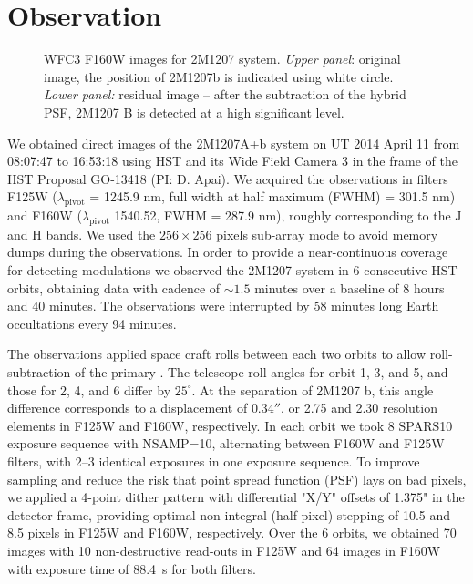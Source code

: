 \documentclass[apj]{emulateapj}
\begin{document}
\section{Observation}

\begin{figure}
  \centering
  \caption{WFC3 F160W images for 2M1207 system. {\em Upper panel}:
    original image, the position of 2M1207b is indicated using white
    circle.   {\em Lower panel:} residual image -- after the
    subtraction of the hybrid PSF, 2M1207 B is detected at a high significant level.}
  \label{fig:1}
\end{figure}

We obtained direct images of the 2M1207A+b system on UT 2014 April 11
from 08:07:47 to 16:53:18 using HST and its Wide Field Camera 3
\citep[WFC3, pixel scale=$\sim0.13''$, ][]{Kimble2008} in the frame of
the HST Proposal GO-13418 (PI: D. Apai). We acquired the observations
in filters F125W ($\lambda_{\mathrm{pivot}}$ = 1245.9 nm, full width
at half maximum (FWHM) = 301.5 nm) and F160W
($\lambda_{\mathrm{pivot}}$ 1540.52, FWHM = 287.9 nm), roughly
corresponding to the J and H bands. We used the $256\times256$ pixels
sub-array mode to avoid memory dumps during the observations.  In
order to provide a near-continuous coverage for detecting modulations
we observed the 2M1207 system in 6 consecutive HST orbits, obtaining
data with cadence of $\sim1.5$ minutes over a baseline of 8 hours and
40 minutes. The observations were interrupted by 58 minutes long Earth
occultations every 94 minutes.

The observations applied space craft rolls between each two orbits to
allow roll-subtraction of the primary \citep[e.g.][]{Song2006}. The
telescope roll angles for orbit 1, 3, and 5, and those for 2, 4, and
6 differ by $25^{\circ}$. At the separation of 2M1207 b, this angle
difference corresponds to a displacement of $0.34''$, or 2.75 and 2.30
resolution elements in F125W and F160W, respectively. In each orbit we
took 8 SPARS10 exposure sequence with NSAMP=10,
alternating between F160W and F125W filters, with 2--3 identical
exposures in one exposure sequence. To improve sampling and reduce the
risk that point spread function (PSF) lays on bad pixels, we applied a
4-point dither pattern with differential "X/Y" offsets of 1.375" in
the detector frame, providing optimal non-integral (half pixel)
stepping of 10.5 and 8.5 pixels in F125W and F160W, respectively. Over
the 6 orbits, we obtained 70 images with 10 non-destructive read-outs
in F125W and 64 images in F160W with exposure time of 88.4~s for both
filters.
\end{document}
